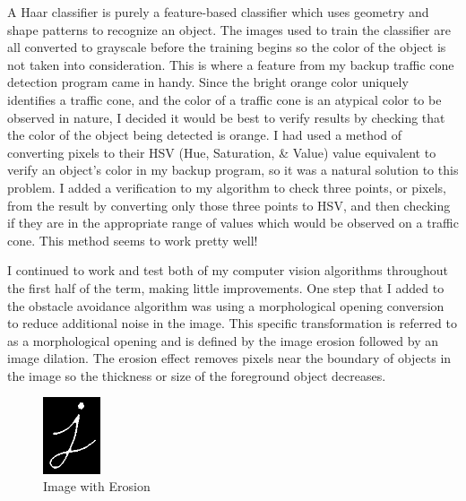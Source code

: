 \documentclass[10pt,letterpaper,onecolumn,draftclsnofoot,journal]{IEEEtran}
\begin{document}
A Haar classifier is purely a feature-based classifier which uses geometry and shape patterns to recognize an object. The images used to train the classifier are all converted to grayscale before the training begins so the color of the object is not taken into consideration. This is where a feature from my backup traffic cone detection program came in handy. Since the bright orange color uniquely identifies a traffic cone, and the color of a traffic cone is an atypical color to be observed in nature, I decided it would be best to verify results by checking that the color of the object being detected is orange. I had used a method of converting pixels to their HSV (Hue, Saturation, \& Value) value equivalent to verify an object's color in my backup program, so it was a natural solution to this problem. I added a verification to my algorithm to check three points, or pixels, from the result by converting only those three points to HSV, and then checking if they are in the appropriate range of values which would be observed on a traffic cone. This method seems to work pretty well!\vspace{.3cm}
\par
I continued to work and test both of my computer vision algorithms throughout the first half of the term, making little improvements. One step that I added to the obstacle avoidance algorithm was using a morphological opening conversion to reduce additional noise in the image. This specific transformation is referred to as a morphological opening and is defined by the image erosion followed by an image dilation. The erosion effect removes pixels near the boundary of objects in the image so the thickness or size of the foreground object decreases.
\begin{figure}[h]
	\captionsetup{justification=raggedright, singlelinecheck=off}
    	\includegraphics[width=0.15\textwidth]{j1}
    	\caption{Image with Erosion}
	\vspace{-.5cm}
\end{figure}
\end{document}
